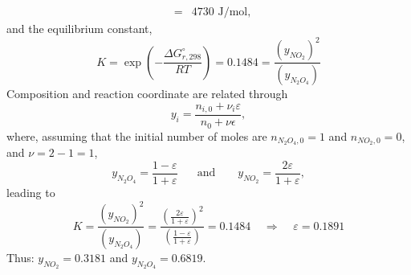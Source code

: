 \documentclass[calculator,allquestions,datasheet,solutions]{exam_newMarcus2}
\newcommand{\frc}{\displaystyle\frac}
\begin{document}
\begin{question}
\begin{enumerate}[a)]
{\begin{eqnarray}
                             &=& 4730 \text{ J/mol}, \nonumber
         \end{eqnarray}
         and the equilibrium constant,
         \begin{displaymath}
             K = \exp\left(-\frc{\Delta G^{\circ}_{r,298}}{RT}\right) = 0.1484 = \frac{\left(y_{NO_{2}}\right)^{2}}{\left(y_{N_{2}O_{4}}\right)}
         \end{displaymath}
         Composition and reaction coordinate are related through
         \begin{displaymath}
            y_{i} = \frc{n_{i,0} + \nu_{i}\varepsilon}{n_{0}+\nu\epsilon},
         \end{displaymath}
         where, assuming that the initial number of moles are $n_{N_{2}O_{4},0}=1$ and $n_{NO_{2},0}=0$, and $\nu= 2-1 = 1$,~
         \begin{displaymath}
            y_{N_{2}O_{4}} = \frc{1-\varepsilon}{1+\varepsilon}\;\;\;\;\;\text{ and }\;\;\;\;\;\; y_{NO_{2}} = \frc{2\varepsilon}{1+\varepsilon},
         \end{displaymath}
         leading to~
         \begin{displaymath}
             K = \frac{\left(y_{NO_{2}}\right)^{2}}{\left(y_{N_{2}O_{4}}\right)} = \frc{\left(\frc{2\varepsilon}{1+\varepsilon}\right)^{2}}{\left(\frc{1-\varepsilon}{1+\varepsilon}\right)} = 0.1484 \;\;\;\;\Longrightarrow\;\;\;\; \varepsilon = 0.1891
         \end{displaymath}
         Thus: $y_{NO_{2}} = 0.3181$ and $y_{N_{2}O_{4}} = 0.6819$.~
           }


\end{enumerate}
\end{question}
\end{document}
